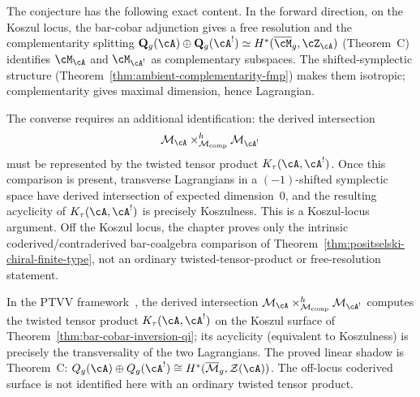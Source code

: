 \begin{remark}
The conjecture has the following exact content. In the forward
direction, on the Koszul locus, the bar-cobar adjunction gives a
free resolution and the complementarity splitting
$\mathbf{Q}_g(\cA) \oplus \mathbf{Q}_g(\cA^!) \simeq
H^*(\overline{\cM}_g, \cZ_\cA)$ (Theorem~C) identifies $\cM_\cA$
and $\cM_{\cA^!}$ as complementary subspaces. The
shifted-symplectic structure
(Theorem~\ref{thm:ambient-complementarity-fmp}) makes them
isotropic; complementarity gives maximal dimension, hence
Lagrangian.

The converse requires an additional identification: the derived
intersection
\[
\mathcal{M}_\cA\times^h_{\mathcal{M}_{\mathrm{comp}}}
\mathcal{M}_{\cA^!}
\]
must be represented by the twisted tensor product
$K_\tau(\cA,\cA^!)$. Once this comparison is present, transverse
Lagrangians in a $(-1)$-shifted symplectic space have derived
intersection of expected dimension~$0$, and the resulting acyclicity
of $K_\tau(\cA,\cA^!)$ is precisely Koszulness.
This is a Koszul-locus argument. Off the Koszul locus, the chapter
proves only the intrinsic coderived/contraderived bar-coalgebra
comparison of Theorem~\ref{thm:positselski-chiral-finite-type}, not an
ordinary twisted-tensor-product or free-resolution statement.
\end{remark}

\begin{remark}\label{rem:lagrangian-ptvv}
In the PTVV framework~\cite{PTVV13}, the derived intersection
$\mathcal{M}_\cA \times^h_{\mathcal{M}_{\mathrm{comp}}}
\mathcal{M}_{\cA^!}$ computes the twisted tensor product
$K_\tau(\cA, \cA^!)$ on the Koszul surface of
Theorem~\ref{thm:bar-cobar-inversion-qi}; its acyclicity
\textup{(}equivalent to Koszulness\textup{)} is
precisely the transversality of the two Lagrangians.
The proved linear shadow is Theorem~C:
$Q_g(\cA) \oplus Q_g(\cA^!) \cong
H^*(\overline{\mathcal{M}}_g, \mathcal{Z}(\cA))$.
The off-locus coderived surface is not identified here with an
ordinary twisted tensor product.
\end{remark}

